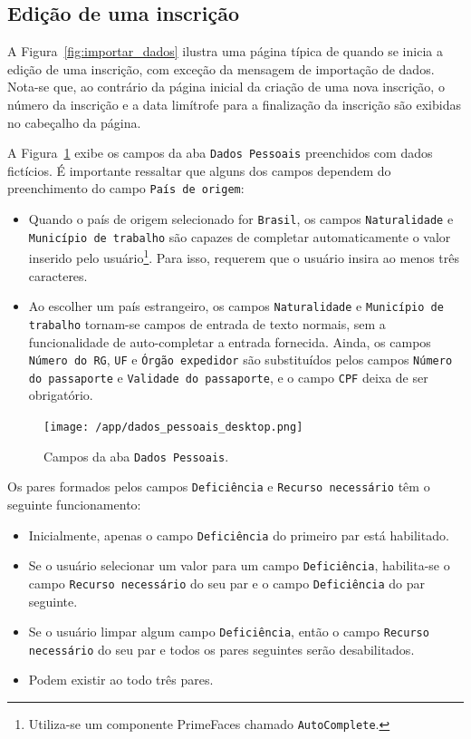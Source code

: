 \documentclass[
  10.5pt,				  %
	openright,			%
	twoside,			  %
  a5paper,
  chapter=TITLE,	%
	section=TITLE,	%
  hyphens,        %
	english,        %
	brazil          %
]{abntex2}
\begin{document}
\subsection{Edição de uma inscrição}\label{sec:edicao_inscricao}

A Figura~\ref{fig:importar_dados} ilustra uma página típica de quando se inicia a edição de uma inscrição, com exceção da mensagem de importação de dados. Nota-se que, ao contrário da página inicial da criação de uma nova inscrição, o número da inscrição e a data limítrofe para a finalização da inscrição são exibidas no cabeçalho da página.

A Figura~\ref{fig:dados_pessoais_desktop} exibe os campos da aba \texttt{Dados Pessoais} preenchidos com dados fictícios. É importante ressaltar que alguns dos campos dependem do preenchimento do campo \texttt{País de origem}:
\begin{itemize}
  \item Quando o país de origem selecionado for \texttt{Brasil}, os campos \texttt{Naturalidade} e \texttt{Município de trabalho} são capazes de completar automaticamente o valor inserido pelo usuário\footnote{Utiliza-se um componente PrimeFaces chamado \texttt{AutoComplete}.}. Para isso, requerem que o usuário insira ao menos três caracteres.
  \item Ao escolher um país estrangeiro, os campos \texttt{Naturalidade} e \texttt{Município de trabalho} tornam-se campos de entrada de texto normais, sem a funcionalidade de auto-completar a entrada fornecida. Ainda, os campos \texttt{Número do RG}, \texttt{UF} e \texttt{Órgão expedidor} são substituídos pelos campos \texttt{Número do passaporte} e \texttt{Validade do passaporte}, e o campo \texttt{CPF} deixa de ser obrigatório.
\end{itemize}
%
\begin{figure}[!ht]
  \caption{\label{fig:dados_pessoais_desktop} Campos da aba \texttt{Dados Pessoais}.}
  \begin{center}
    \texttt{[image: /app/dados\_pessoais\_desktop.png]}
  \end{center}
\end{figure}
%
Os pares formados pelos campos \texttt{Deficiência} e \texttt{Recurso necessário} têm o seguinte funcionamento: 

\begin{itemize}
  \item Inicialmente, apenas o campo \texttt{Deficiência} do primeiro par está habilitado.
  \item Se o usuário selecionar um valor para um campo \texttt{Deficiência}, habilita-se o campo \texttt{Recurso necessário} do seu par e o campo \texttt{Deficiência} do par seguinte.
  \item Se o usuário limpar algum campo \texttt{Deficiência}, então o campo \texttt{Recurso necessário} do seu par e todos os pares seguintes serão desabilitados. 
  \item Podem existir ao todo três pares.
\end{itemize}
\end{document}
